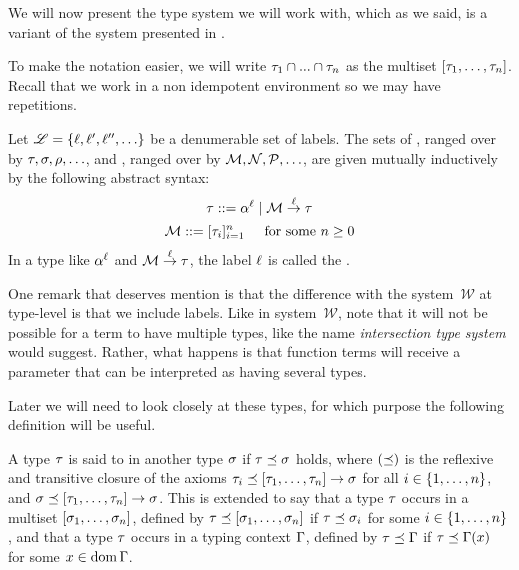 We will now present the type system we will work with, which as we said, is a variant of the system presented
in \cite{bucciarelli2017non}.

To make the notation easier, we will write $\tau_1 \cap ... \cap \tau_n$ as the
multiset $[\tau_1, \hdots, \tau_n]$.
Recall that we work in a non idempotent environment so we may have repetitions.

\begin{definition}[Types]
Let $\mathscr{L} = \{\ell,\ell',\ell'',\hdots\}$ be a denumerable set of labels.
The sets of , ranged over by $\tau,\sigma,\rho,\hdots$,
and , ranged over by $\mathcal{M},\mathcal{N},\mathcal{P},\hdots$,
are given mutually inductively by the following abstract syntax:
\[
  \tau ::= \alpha^{\ell} \mid \mathcal{M} \overset{\ell}{\to} \tau
\]
\[
  \mathcal{M} ::= [\tau_i]_{i=1}^{n} \hspace{.5cm} \text{for some $n \geq 0$}
\]
In a type like $\alpha^{\ell}$ and $\mathcal{M} \overset{\ell}{\to} \tau$,
the label $\ell$ is called the .
\end{definition}

One remark that deserves mention is that the difference with the system~$\mathcal{W}$
at type-level is that we include labels.
Like in system~$\mathcal{W}$, note that it will not be possible for a term to have multiple types,
like the name \textit{intersection type system} would suggest.
Rather, what happens is that function terms will receive a parameter that can be interpreted
as having several types.

Later we will need to look closely at these types,
for which purpose the following definition will be useful.

\begin{definition}
A type $\tau$ is said to  in another type $\sigma$ if
$\tau \preceq \sigma$ holds,
where $(\preceq)$ is the reflexive and transitive closure of
the axioms
$\tau_i \preceq [\tau_1,\hdots,\tau_n] \to \sigma$ for all $i \in \{1,\hdots,n\}$,
and $\sigma \preceq [\tau_1,\hdots,\tau_n] \to \sigma$.
This is extended to say that a type $\tau$ occurs in a multiset $[\sigma_1,\hdots,\sigma_n]$,
defined by $\tau \preceq [\sigma_1,\hdots,\sigma_n]$ if $\tau \preceq \sigma_i$
for some $i\in\{1,\hdots,n\}$,
and that a type $\tau$ occurs in a typing context $\Gamma$,
defined by $\tau \preceq \Gamma$ if $\tau \preceq \Gamma(x)$ for some $x \in \operatorname{dom}\Gamma$.
\end{definition}
